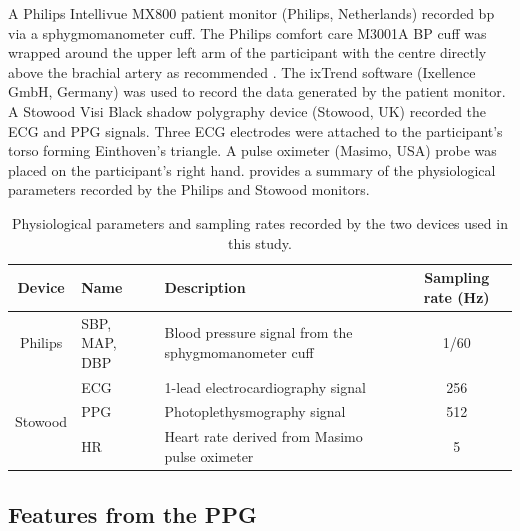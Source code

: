 \documentclass[fleqn,10pt]{wlscirep}
\begin{document}
A Philips Intellivue MX800 patient monitor (Philips, Netherlands) recorded \ac{bp} via a sphygmomanometer cuff. The Philips comfort care M3001A BP cuff was wrapped around the upper left arm of the participant with the centre directly above the brachial artery as recommended \cite{NationalInstituteforHealthandCareExcellence2011}. The ixTrend software (Ixellence GmbH, Germany) was used to record the data generated by the patient monitor. A Stowood Visi Black shadow polygraphy device (Stowood, UK) recorded the ECG and PPG signals. Three ECG electrodes were attached to the participant's torso forming Einthoven's triangle. A pulse oximeter (Masimo, USA) probe was placed on the participant’s right hand.   provides a summary of the physiological parameters recorded by the Philips and Stowood monitors. 


\begin{table}
	\centering
	\caption{Physiological parameters and sampling rates recorded by the two devices used in this study.}
	\small
		
		\begin{tabular}{|c |l | l | c| }
			\hline
			\textbf{Device} & \textbf{Name} &\textbf{Description}  &\textbf{Sampling rate (Hz)}\\
			\hline
			\multirow{1}{*}{Philips} &SBP, MAP, DBP & Blood pressure signal from the sphygmomanometer cuff & 1/60\\
			\hline
			\multirow{3}{*}{Stowood} &ECG & 1-lead electrocardiography signal & 256 \\
			& PPG & Photoplethysmography signal & 512\\	
			& HR & Heart rate derived from Masimo pulse oximeter & 5 \\
		
			\hline
		\end{tabular}
	\label{table:MOLLIE:device_params}

\end{table}
\normalsize



\subsection{Features from the PPG}
\end{document}
